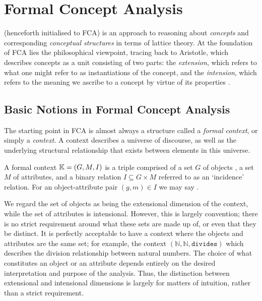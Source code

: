 \chapter{Formal Concept Analysis}
\label{chapter:formal-concept-analysis}

\FCA (henceforth initialised to FCA) is an approach to reasoning about \textit{concepts} and corresponding \textit{conceptual structures} in terms of lattice theory. At the foundation of FCA lies the philosophical
viewpoint, tracing back to Aristotle, which describes concepts as a unit consisting of two parts: the \textit{extension}, which refers to what one might refer to as instantiations of the concept, and the
\textit{intension}, which refers to the meaning we ascribe to a concept by virtue of its properties \cite{ganter1999formal, WILLE1992493, DUQUENNE1999407}.

\section{Basic Notions in Formal Concept Analysis}
\label{section:basic-notions}

The starting point in FCA is almost always a structure called a \textit{formal context}, or simply a \textit{context}. A context describes a universe of discourse, as well as the underlying structural
relationship that exists between elements in this universe.
%
\begin{definition}
   \label{definition:formal-context} A formal context $\mathbb{K} = (G,M,\mathrel{I})$ is a triple comprised of a set $G$ of objects , a set $M$ of attributes, and a binary relation
  $I \subseteq G \times M$ referred to as an `incidence' relation. For an object-attribute pair $(g,m) \in I$ we may say .
\end{definition}

We regard the set of objects as being the extensional dimension of the context, while the set of attributes is intensional. However, this is largely convention; there is no strict requirement around what
these sets are made up of, or even that they be distinct. It is perfectly acceptable to have a context where the objects and attributes are the same set; for example, the context $(\mathbb{N}, \mathbb{N}
, \texttt{divides})$ which describes the division relationship between natural numbers. The choice of what constitutes an object or an attribute depends entirely on the desired interpretation and
purpose of the analysis. Thus, the distinction between extensional and intensional dimensions is largely for matters of intuition, rather than a strict requirement.

